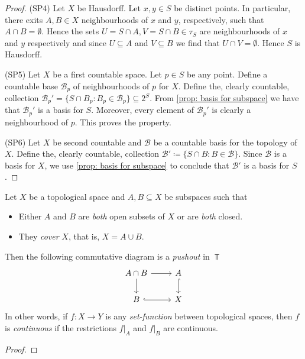 \begin{proof}
(SP4) Let \(X\) be Hausdorff. Let \(x, y \in S\) be distinct points. In
particular, there exits \(A, B \in X\) neighbourhoods of \(x\) and \(y\),
respectively, such that \(A \cap B = \emptyset\). Hence the sets \(U = S \cap
A, V = S \cap B \in \tau_S\) are neighbourhoods of \(x\) and \(y\)
respectively and since \(U \subseteq A\) and \(V \subseteq B\) we find that
\(U \cap V = \emptyset\). Hence \(S\) is Hausdorff.

(SP5) Let \(X\) be a first countable space. Let \(p \in S\) be any point.
Define a countable base \(\mathcal B_p\) of neighbourhoods of \(p\) for \(X\).
Define the, clearly countable, collection
\(\mathcal B_p' = \{S \cap B_p \colon B_p \in \mathcal B_p\} \subseteq
2^S\). From \cref{prop: basis for subspace} we have that \(\mathcal B_p'\) is a
basis for \(S\). Moreover, every element of \(\mathcal B_p'\) is clearly a
neighbourhood of \(p\). This proves the property.

(SP6) Let \(X\) be second countable and \(\mathcal B\) be a countable basis for
the topology of \(X\). Define the, clearly countable, collection
\(\mathcal B' \coloneq \{S \cap B \colon B \in \mathcal B\}\). Since
\(\mathcal B\) is a basis for \(X\), we use \cref{prop: basis for subspace} to
conclude that \(\mathcal B'\) is a basis for \(S\).
\end{proof}

\begin{proposition}
\label{prop:continuous-from-covering-subspaces}
Let \(X\) be a topological space and \(A, B \subseteq X\) be subspaces such that
\begin{itemize}\setlength\itemsep{0em}
\item Either \(A\) and \(B\) are \emph{both} open subsets of \(X\) or are
  \emph{both} closed.

\item They \emph{cover} \(X\), that is, \(X = A \cup B\).
\end{itemize}
Then the following commutative diagram is a \emph{pushout} in \(\Top\)
\[
\begin{tikzcd}
A \cap B \ar[r] \ar[d] & A \ar[d, hook] \\
B \ar[r, hook] & X
\end{tikzcd}
\]
In other words, if \(f: X \to Y\) is any \emph{set-function} between topological
spaces, then \(f\) is \emph{continuous} if the restrictions \(f|_A\) and
\(f|_B\) are continuous.
\end{proposition}

\begin{proof}
\end{proof}


